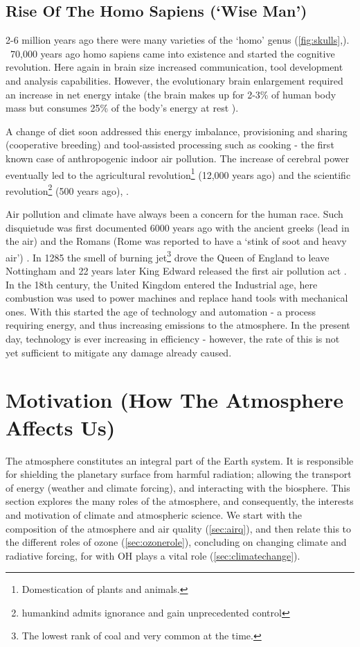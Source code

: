 \subsection{Rise Of The Homo Sapiens (`Wise Man')}
2-6 million years ago there were many varieties of the `homo' genus (\autoref{fig:skulls},\cite{skull}). ~70,000 years ago homo sapiens came into existence and started the cognitive revolution. Here again in brain size increased communication, tool development and analysis capabilities. However, the evolutionary brain enlargement required an increase in net energy intake \citep{brainenergy} (the brain makes up for 2-3\% of human body mass but consumes 25\% of the body's energy at rest \citep{sapiens}).

A change of diet \citep{diet} soon addressed this energy imbalance, provisioning and sharing (cooperative breeding) and tool-assisted processing such as cooking \citep{cooking} - the first known case of anthropogenic indoor air pollution. The increase of cerebral power eventually led to the agricultural revolution\footnote{Domestication of plants and animals.} (12,000 years ago) and the scientific revolution\footnote{ humankind admits ignorance and gain unprecedented control} (500 years ago), \citep{sapiens}.

 Air pollution and climate have always been a concern for the human race. Such disquietude was first documented 6000 years ago with the ancient greeks  (lead in the air) \citep{skeptical} and the Romans (Rome was reported to have a `stink of soot and heavy air') \citep{roman}. In 1285 the smell of burning jet\footnote{The lowest rank of coal and very common at the time.} drove the Queen of England to leave Nottingham and 22 years later King Edward released the first air pollution act \citep{coal1}. In the 18th century, the United Kingdom entered the Industrial age, here combustion was used to power machines and replace hand tools with mechanical ones. With this started the age of technology and automation - a process requiring energy, and thus increasing emissions to the atmosphere. In the present day, technology is ever increasing in efficiency - however, the rate of this is not yet sufficient to mitigate any damage already caused.


\section{Motivation (How The Atmosphere Affects Us)}
The atmosphere constitutes an integral part of the Earth system. It is responsible for shielding the planetary surface from harmful radiation; allowing the transport of energy (weather and climate forcing), and interacting with the biosphere. This section explores the many roles of the atmosphere, and consequently, the interests and motivation of climate and atmospheric science. We start with the composition of the atmosphere and air quality (\autoref{sec:airq}), and then relate this to the different roles of ozone (\autoref{sec:ozonerole}), concluding on changing climate and radiative forcing, for with OH plays a vital role (\autoref{sec:climatechange}).



